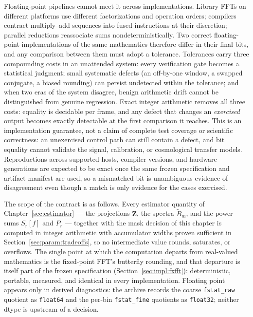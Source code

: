 Floating-point pipelines cannot meet it across implementations. Library FFTs on different platforms use different factorizations and operation orders; compilers contract multiply--add sequences into fused instructions at their discretion; parallel reductions reassociate sums nondeterministically. Two correct floating-point implementations of the same mathematics therefore differ in their final bits, and any comparison between them must adopt a tolerance. Tolerances carry three compounding costs in an unattended system: every verification gate becomes a statistical judgment; small systematic defects (an off-by-one window, a swapped conjugate, a biased rounding) can persist undetected within the tolerance; and when two eras of the system disagree, benign arithmetic drift cannot be distinguished from genuine regression. Exact integer arithmetic removes all three costs: equality is decidable per frame, and any defect that changes an \emph{exercised} output becomes exactly detectable at the first comparison it reaches.  This is an implementation guarantee, not a claim of complete test coverage or scientific correctness: an unexercised control path can still contain a defect, and bit equality cannot validate the signal, calibration, or cosmological transfer models.  Reproductions across supported hosts, compiler versions, and hardware generations are expected to be exact once the same frozen specification and artifact manifest are used, so a mismatched bit is unambiguous evidence of disagreement even though a match is only evidence for the cases exercised.

The scope of the contract is as follows. Every estimator quantity of Chapter~\ref{sec:estimator} --- the projections $\mathbf{Z}$, the spectra $\widetilde{B}_m$, and the power sums $S_r[f]$ and $P_r$ --- together with the mask decision of this chapter is computed in integer arithmetic with accumulator widths proven sufficient in Section~\ref{sec:param:tradeoffs}, so no intermediate value rounds, saturates, or overflows. The single point at which the computation departs from real-valued mathematics is the fixed-point FFT's butterfly rounding, and that departure is itself part of the frozen specification (Section~\ref{sec:impl:fxfft}): deterministic, portable, measured, and identical in every implementation. Floating point appears only in derived diagnostics: the archive records the coarse \texttt{fstat\_raw} quotient as \texttt{float64} and the per-bin \texttt{fstat\_fine} quotients as \texttt{float32}; neither dtype is upstream of a decision.

